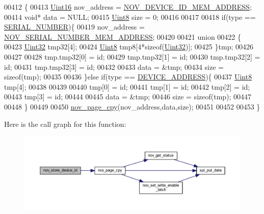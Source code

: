 \begin{DoxyCode}
00412 \{
00413     \hyperlink{a00072_a59a9f6be4562c327cbfb4f7e8e18f08b}{Uint16}       nov\_address = \hyperlink{a00029_a3ddbe5b40319c96bfe46429e902f8d33}{NOV\_DEVICE\_ID\_MEM\_ADDRESS};
00414     \textcolor{keywordtype}{void}*        data = NULL;
00415     \hyperlink{a00072_af84840501dec18061d18a68c162a8fa2}{Uint8}        size = 0;
00416 
00417 
00418     \textcolor{keywordflow}{if}(type == \hyperlink{a00029_ad8a20d143f6a7579ed227578aeddec21}{SERIAL\_NUMBER})\{
00419     nov\_address = \hyperlink{a00029_ab7dc1ea8a7f6e16cf27fbfe88efd7285}{NOV\_SERIAL\_NUMBER\_MEM\_ADDRESS};
00420 
00421     \textcolor{keyword}{union}
00422     \{
00423         \hyperlink{a00072_aba99025e657f892beb7ff31cecf64653}{Uint32} tmp32[4];
00424         \hyperlink{a00072_af84840501dec18061d18a68c162a8fa2}{Uint8}  tmp8[4*\textcolor{keyword}{sizeof}(\hyperlink{a00072_aba99025e657f892beb7ff31cecf64653}{Uint32})];
00425     \}tmp;
00426 
00427 
00428     tmp.tmp32[0] = id;
00429     tmp.tmp32[1] = id;
00430     tmp.tmp32[2] = id;
00431     tmp.tmp32[3] = id;
00432     
00433     data = &tmp;
00434     size = \textcolor{keyword}{sizeof}(tmp);
00435 
00436     \}\textcolor{keywordflow}{else} \textcolor{keywordflow}{if}(type == \hyperlink{a00029_a457be1c5e5fee67ed7d01f5887c2d656}{DEVICE\_ADDRESS})\{
00437        \hyperlink{a00072_af84840501dec18061d18a68c162a8fa2}{Uint8}  tmp[4];
00438 
00439 
00440         tmp[0] = id;
00441         tmp[1] = id;
00442         tmp[2] = id;
00443         tmp[3] = id;
00444 
00445         data = &tmp;
00446         size = \textcolor{keyword}{sizeof}(tmp);
00447 
00448     \}
00449  
00450     \hyperlink{a00060_aeb021b0e002db120ad733c24f3e179bc}{nov\_page\_cpy}(nov\_address,data,size);
00451 
00452     
00453 \}
\end{DoxyCode}


Here is the call graph for this function\+:
\nopagebreak
\begin{figure}[H]
\begin{center}
\leavevmode
\includegraphics[width=350pt]{d5/d16/a00029_a9aa94b184db1bd55b6a4a61a34c14c8d_cgraph}
\end{center}
\end{figure}


